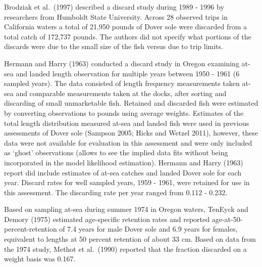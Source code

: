 \documentclass[11pt,
  english,
  a4paper,
]{article}
\begin{document}

Brodziak et al.~{(1997)\leavevmode\tagmcend\tagstructend} described a discard study during 1989 - 1996 by researchers from Humboldt State University. Across 28 observed trips in California waters a total of 21,950 pounds of Dover sole were discarded from a total catch of 172,737 pounds. The authors did not specify what portions of the discards were due to the small size of the fish versus due to trip limits.

\leavevmode\tagmcend\tagstructend\par


Hermann and Harry {(1963)\leavevmode\tagmcend\tagstructend} conducted a discard study in Oregon examining at-sea and landed length observation for multiple years between 1950 - 1961 (6 sampled years). The data consisted of length frequency measurements taken at-sea and comparable measurements taken at the docks, after sorting and discarding of small unmarketable fish. Retained and discarded fish were estimated by converting observations to pounds using average weights. Estimates of the total length distribution measured at-sea and landed fish were used in previous assessments of Dover sole {(Sampson 2005; Hicks and Wetzel 2011)\leavevmode\tagmcend\tagstructend}, however, these data were not available for evaluation in this assessment and were only included as `ghost' observations (allows to see the implied data fits without being incorporated in the model likelihood estimation). Hermann and Harry {(1963)\leavevmode\tagmcend\tagstructend} report did include estimates of at-sea catches and landed Dover sole for each year. Discard rates for well sampled years, 1959 - 1961, were retained for use in this assessment. The discarding rate per year ranged from 0.112 - 0.232.

\leavevmode\tagmcend\tagstructend\par


Based on sampling at-sea during summer 1974 in Oregon waters, TenEyck and Demory {(1975)\leavevmode\tagmcend\tagstructend} estimated age-specific retention rates and reported age-at-50-percent-retention of 7.4 years for male Dover sole and 6.9 years for females, equivalent to lengths at 50 percent retention of about 33 cm. Based on data from the 1974 study, Methot et al.~{(1990)\leavevmode\tagmcend\tagstructend} reported that the fraction discarded on a weight basis was 0.167.
\end{document}
